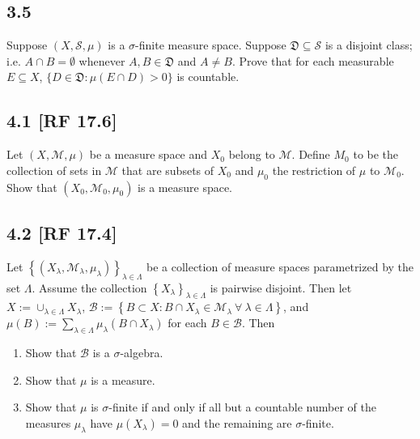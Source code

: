 \documentclass[12pt]{article}
\begin{document}
\subsection*{3.5}
\begin{tcolorbox}
Suppose $(X, \mathcal{S}, \mu)$ is a $\sigma$-finite measure space. Suppose $\mathfrak{D} \subseteq \mathcal{S}$ is a disjoint class; i.e. $A\cap B = \emptyset$
whenever $A, B \in \mathfrak{D}$ and $A \neq B$. Prove that for each measurable $E \subseteq X$, $\{D \in \mathfrak{D} : \mu(E\cap D) > 0\}$ is
countable.
\end{tcolorbox}



\newpage
\subsection*{4.1 [RF 17.6]}
\begin{tcolorbox}
Let $(X, \mathcal{M}, \mu)$ be a measure space and $X_{0}$ belong to $\mathcal{M}$. Define $M_{0}$ to be the collection of sets in $\mathcal{M}$ that
are subsets of $X_{0}$ and $\mu_{0}$ the restriction of $\mu$ to $\mathcal{M}_{0}$. Show that $(X_{0}, \mathcal{M}_{0}, \mu_{0})$ is a measure space.
\end{tcolorbox}

\subsection*{4.2 [RF 17.4]}
\begin{tcolorbox}
Let $\left\{ (X_{\lambda}, \mathcal{M}_{\lambda}, \mu_{\lambda}) \right\}_{\lambda \in \Lambda}$ be a collection of measure spaces parametrized by the
set $\Lambda$. Assume the collection $\left\{ X_{\lambda} \right\}_{\lambda\in\Lambda}$ is pairwise disjoint. Then let $X := \cup_{\lambda \in
\Lambda}X_{\lambda}$, $\mathcal{B} := \left\{ B \subset X : B\cap X_{\lambda} \in \mathcal{M}_{\lambda}\ \forall \ \lambda \in \Lambda \right\}$, and
$\mu(B) := \sum_{\lambda\in\Lambda}\mu_{\lambda}(B\cap X_{\lambda})$ for each $B\in\mathcal{B}$. Then 
\begin{enumerate}[label=(\roman*)]
\item Show that $\mathcal{B}$ is a $\sigma$-algebra.
\item Show that $\mu$ is a measure.
\item Show that $\mu$ is $\sigma$-finite if and only if all but a countable number of the measures $\mu_{\lambda}$ have $\mu(X_{\lambda}) = 0$ and the
remaining are $\sigma$-finite.
\end{enumerate}
\end{tcolorbox}
\end{document}
